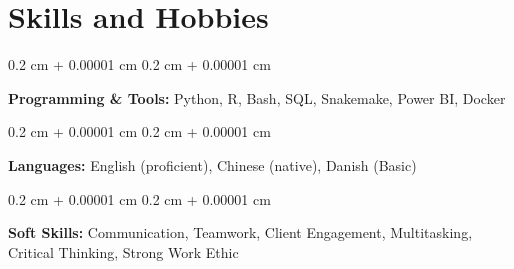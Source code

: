 \documentclass[10pt, letterpaper]{article}
\newenvironment{onecolentry}{
    \begin{adjustwidth}{
        0.2 cm + 0.00001 cm
    }{
        0.2 cm + 0.00001 cm
    }
}{
    \end{adjustwidth}
} %
\begin{document}

        

    


    
    \section{Skills and Hobbies}

        \begin{onecolentry}
            \textbf{Programming \& Tools:} Python, R, Bash, SQL, Snakemake, Power BI, Docker
        \end{onecolentry}

        \vspace{0.2 cm}

        \begin{onecolentry}
            \textbf{Languages:} English (proficient), Chinese (native), Danish (Basic)
        \end{onecolentry}

        \vspace{0.2 cm}

        \begin{onecolentry}
            \textbf{Soft Skills:} Communication, Teamwork, Client Engagement, Multitasking, Critical Thinking, Strong Work Ethic
        \end{onecolentry}
\end{document}
